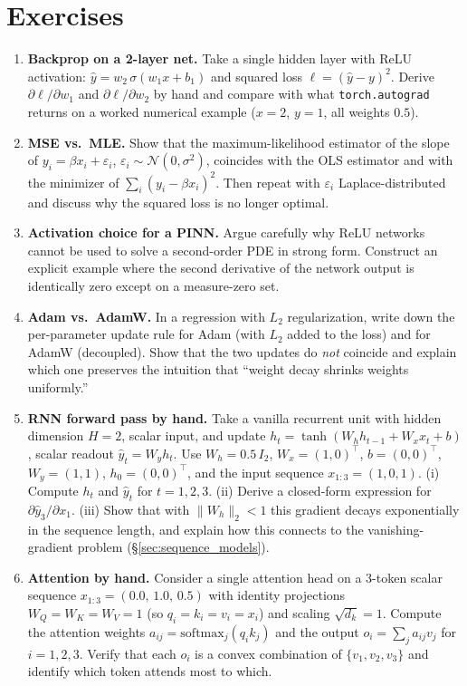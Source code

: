 \documentclass[11pt,a4paper]{report}
\begin{document}
\section*{Exercises}
\begin{enumerate}[itemsep=4pt, leftmargin=*]
\item\label{ex:ch1:1} \textbf{Backprop on a 2-layer net.}  Take a single hidden layer with ReLU activation: $\hat y = w_2\,\sigma(w_1 x + b_1)$ and squared loss $\ell = (\hat y - y)^2$.  Derive $\partial \ell / \partial w_1$ and $\partial \ell / \partial w_2$ by hand and compare with what \texttt{torch.autograd} returns on a worked numerical example ($x=2$, $y=1$, all weights $0.5$).
\item\label{ex:ch1:2} \textbf{MSE vs.\ MLE.}  Show that the maximum-likelihood estimator of the slope of $y_i = \beta x_i + \varepsilon_i$, $\varepsilon_i \sim \mathcal{N}(0,\sigma^2)$, coincides with the OLS estimator and with the minimizer of $\sum_i (y_i - \beta x_i)^2$.  Then repeat with $\varepsilon_i$ Laplace-distributed and discuss why the squared loss is no longer optimal.
\item\label{ex:ch1:3} \textbf{Activation choice for a PINN.}  Argue carefully why ReLU networks cannot be used to solve a second-order PDE in strong form.  Construct an explicit example where the second derivative of the network output is identically zero except on a measure-zero set.
\item\label{ex:ch1:4} \textbf{Adam vs.\ AdamW.}  In a regression with $L_2$ regularization, write down the per-parameter update rule for Adam (with $L_2$ added to the loss) and for AdamW (decoupled).  Show that the two updates do \emph{not} coincide and explain which one preserves the intuition that ``weight decay shrinks weights uniformly.''
\item\label{ex:ch1:5} \textbf{RNN forward pass by hand.}  Take a vanilla recurrent unit with hidden dimension $H=2$, scalar input, and update $h_t = \tanh(W_h h_{t-1} + W_x x_t + b)$, scalar readout $\hat y_t = W_y h_t$.  Use $W_h = 0.5\,I_2$, $W_x = (1,0)^\top$, $b = (0,0)^\top$, $W_y = (1,1)$, $h_0 = (0,0)^\top$, and the input sequence $x_{1:3} = (1, 0, 1)$.  (i) Compute $h_t$ and $\hat y_t$ for $t = 1, 2, 3$.  (ii) Derive a closed-form expression for $\partial \hat y_3 / \partial x_1$.  (iii) Show that with $\|W_h\|_2 < 1$ this gradient decays exponentially in the sequence length, and explain how this connects to the vanishing-gradient problem (\S\ref{sec:sequence_models}).
\item\label{ex:ch1:6} \textbf{Attention by hand.}  Consider a single attention head on a 3-token scalar sequence $x_{1:3} = (0.0,\, 1.0,\, 0.5)$ with identity projections $W_Q = W_K = W_V = 1$ (so $q_i = k_i = v_i = x_i$) and scaling $\sqrt{d_k} = 1$.  Compute the attention weights $a_{ij} = \mathrm{softmax}_j(q_i k_j)$ and the output $o_i = \sum_j a_{ij} v_j$ for $i = 1, 2, 3$.  Verify that each $o_i$ is a convex combination of $\{v_1, v_2, v_3\}$ and identify which token attends most to which.

\end{enumerate}
\end{document}

